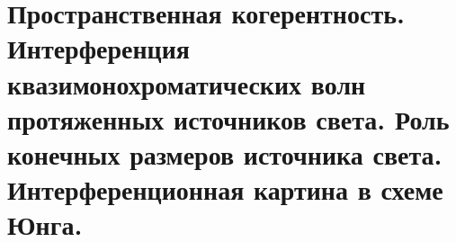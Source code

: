 \section{Пространственная когерентность. Интерференция квазимонохроматических волн протяженных источников света. Роль конечных размеров источника света. Интерференционная картина в схеме Юнга.}
